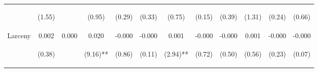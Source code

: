 \begin{tabular}{lccccccccccc}
 & \begin{footnotesize}(1.55)\end{footnotesize} & \begin{footnotesize}\end{footnotesize} & \begin{footnotesize}(0.95)\end{footnotesize} & \begin{footnotesize}(0.29)\end{footnotesize} & \begin{footnotesize}(0.33)\end{footnotesize} & \begin{footnotesize}(0.75)\end{footnotesize} & \begin{footnotesize}(0.15)\end{footnotesize} & \begin{footnotesize}(0.39)\end{footnotesize} & \begin{footnotesize}(1.31)\end{footnotesize} & \begin{footnotesize}(0.24)\end{footnotesize} & \begin{footnotesize}(0.66)\end{footnotesize}\\
\noalign{\smallskip}Larceny & 0.002 & 0.000 & 0.020 & -0.000 & -0.000 & 0.001 & -0.000 & -0.000 & 0.001 & -0.000 & -0.000\\
 & \begin{footnotesize}(0.38)\end{footnotesize} & \begin{footnotesize}\end{footnotesize} & \begin{footnotesize}(9.16)**\end{footnotesize} & \begin{footnotesize}(0.86)\end{footnotesize} & \begin{footnotesize}(0.11)\end{footnotesize} & \begin{footnotesize}(2.94)**\end{footnotesize} & \begin{footnotesize}(0.72)\end{footnotesize} & \begin{footnotesize}(0.50)\end{footnotesize} & \begin{footnotesize}(0.56)\end{footnotesize} & \begin{footnotesize}(0.23)\end{footnotesize} & \begin{footnotesize}(0.07)\end{footnotesize}\\

\end{tabular}
